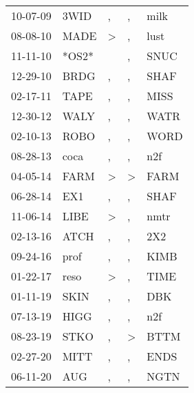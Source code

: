\begin{supertabular}{lllll}
 10-07-09 &   3WID &             , &                , &   milk \\
 08-08-10 &   MADE &  \textgreater &                , &   lust \\
 11-11-10 &  *OS2* &               &                , &   SNUC \\
 12-29-10 &   BRDG &             , &                , &   SHAF \\
 02-17-11 &   TAPE &             , &                , &   MISS \\
 12-30-12 &   WALY &             , &                , &   WATR \\
 02-10-13 &   ROBO &             , &                , &   WORD \\
 08-28-13 &   coca &             , &                , &    n2f \\
 04-05-14 &   FARM &  \textgreater &     \textgreater &   FARM \\
 06-28-14 &    EX1 &             , &                , &   SHAF \\
 11-06-14 &   LIBE &  \textgreater &                , &   nmtr \\
 02-13-16 &   ATCH &             , &                , &    2X2 \\
 09-24-16 &   prof &             , &                , &   KIMB \\
 01-22-17 &   reso &  \textgreater &                , &   TIME \\
 01-11-19 &   SKIN &             , &                , &    DBK \\
 07-13-19 &   HIGG &             , &                , &    n2f \\
 08-23-19 &   STKO &             , &     \textgreater &   BTTM \\
 02-27-20 &   MITT &             , &                , &   ENDS \\
 06-11-20 &    AUG &             , &                , &   NGTN \\
\end{supertabular}
